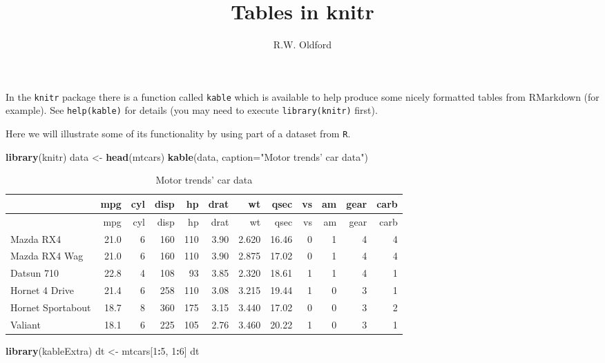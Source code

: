 \documentclass[]{article}
\title{Tables in knitr}
\author{R.W. Oldford}
\date{}
\newenvironment{Shaded}{\begin{snugshade}}{\end{snugshade}}
\newcommand{\KeywordTok}[1]{\textcolor[rgb]{0.13,0.29,0.53}{\textbf{#1}}}
\newcommand{\DataTypeTok}[1]{\textcolor[rgb]{0.13,0.29,0.53}{#1}}
\newcommand{\DecValTok}[1]{\textcolor[rgb]{0.00,0.00,0.81}{#1}}
\newcommand{\StringTok}[1]{\textcolor[rgb]{0.31,0.60,0.02}{#1}}
\newcommand{\OperatorTok}[1]{\textcolor[rgb]{0.81,0.36,0.00}{\textbf{#1}}}
\newcommand{\NormalTok}[1]{#1}
\begin{document}
\maketitle

In the \texttt{knitr} package there is a function called \texttt{kable}
which is available to help produce some nicely formatted tables from
RMarkdown (for example). See \texttt{help(kable)} for details (you may
need to execute \texttt{library(knitr)} first).

Here we will illustrate some of its functionality by using part of a
dataset from \texttt{R}.

\begin{Shaded}
\begin{Highlighting}[]
\KeywordTok{library}\NormalTok{(knitr)}
\NormalTok{data <-}\StringTok{ }\KeywordTok{head}\NormalTok{(mtcars)}
\KeywordTok{kable}\NormalTok{(data, }\DataTypeTok{caption=}\StringTok{"Motor trends' car data"}\NormalTok{)}
\end{Highlighting}
\end{Shaded}

\begin{longtable}[]{@{}lrrrrrrrrrrr@{}}
\caption{Motor trends' car data}\tabularnewline
\toprule
& mpg & cyl & disp & hp & drat & wt & qsec & vs & am & gear &
carb\tabularnewline
\midrule
\endfirsthead
\toprule
& mpg & cyl & disp & hp & drat & wt & qsec & vs & am & gear &
carb\tabularnewline
\midrule
\endhead
Mazda RX4 & 21.0 & 6 & 160 & 110 & 3.90 & 2.620 & 16.46 & 0 & 1 & 4 &
4\tabularnewline
Mazda RX4 Wag & 21.0 & 6 & 160 & 110 & 3.90 & 2.875 & 17.02 & 0 & 1 & 4
& 4\tabularnewline
Datsun 710 & 22.8 & 4 & 108 & 93 & 3.85 & 2.320 & 18.61 & 1 & 1 & 4 &
1\tabularnewline
Hornet 4 Drive & 21.4 & 6 & 258 & 110 & 3.08 & 3.215 & 19.44 & 1 & 0 & 3
& 1\tabularnewline
Hornet Sportabout & 18.7 & 8 & 360 & 175 & 3.15 & 3.440 & 17.02 & 0 & 0
& 3 & 2\tabularnewline
Valiant & 18.1 & 6 & 225 & 105 & 2.76 & 3.460 & 20.22 & 1 & 0 & 3 &
1\tabularnewline
\bottomrule
\end{longtable}

\begin{Shaded}
\begin{Highlighting}[]
\KeywordTok{library}\NormalTok{(kableExtra)}
\NormalTok{dt <-}\StringTok{ }\NormalTok{mtcars[}\DecValTok{1}\OperatorTok{:}\DecValTok{5}\NormalTok{, }\DecValTok{1}\OperatorTok{:}\DecValTok{6}\NormalTok{]}
\NormalTok{dt}
\end{Highlighting}
\end{Shaded}
\end{document}
